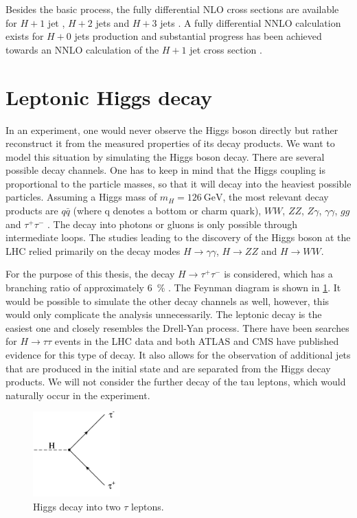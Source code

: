 Besides the basic process, the fully differential NLO cross sections are available for $H + 1$ jet \cite{gghj_nlo_fullydiff_1,gghj_nlo_fullydiff_2}, $H + 2$ jets \cite{gghjj_nlo_fullydiff_1,gghjj_nlo_fullydiff_2} and $H + 3$ jets \cite{gghjjj_nlo_fullydiff}.
A fully differential NNLO calculation exists for $H + 0$ jets production \cite{ggh_nnlo_fullydiff_1,ggh_nnlo_fullydiff_2} and substantial progress has been achieved towards an NNLO calculation of the $H + 1$ jet cross section \cite{gghj_nnlo_progress}.
%
\section{Leptonic Higgs decay}
In an experiment, one would never observe the Higgs boson directly but rather reconstruct it from the measured properties of its decay products.
We want to model this situation by simulating the Higgs boson decay.
There are several possible decay channels.
One has to keep in mind that the Higgs coupling is proportional to the particle masses, so that it will decay into the heaviest possible particles.
Assuming a Higgs mass of $m_H = \SI{126}{\giga\electronvolt}$, the most relevant decay products are $q \bar q$ (where q denotes a bottom or charm quark), $WW$, $ZZ$, $Z \gamma$, $\gamma \gamma$, $gg$ and $\tau^+ \tau^-$ \cite{higgshandbook2}.
The decay into photons or gluons is only possible through intermediate loops.
The studies leading to the discovery of the Higgs boson at the LHC relied primarily on the decay modes $H \rightarrow \gamma \gamma$, $H \rightarrow ZZ$ and $H \rightarrow WW$.

For the purpose of this thesis, the decay $H \rightarrow \tau^+ \tau^-$ is considered, which has a branching ratio of approximately \SI{6}{\percent} \cite{higgshandbook3}.
The Feynman diagram is shown in \cref{fig:h_tautau}.
It would be possible to simulate the other decay channels as well, however, this would only complicate the analysis unnecessarily.
The leptonic decay is the easiest one and closely resembles the Drell-Yan process.
There have been searches for $H \rightarrow \tau \tau$ events in the LHC data and both ATLAS \cite{htau_atlas} and CMS \cite{htau_cms} have published evidence for this type of decay.
It also allows for the observation of additional jets that are produced in the initial state and are separated from the Higgs decay products.
We will not consider the further decay of the tau leptons, which would naturally occur in the experiment.
%
\begin{figure}[]
	\includegraphics[width=0.3\textwidth]{images/h_tautau.pdf}
	\caption{Higgs decay into two $\tau$ leptons.}
	\label{fig:h_tautau}
\end{figure}
%
